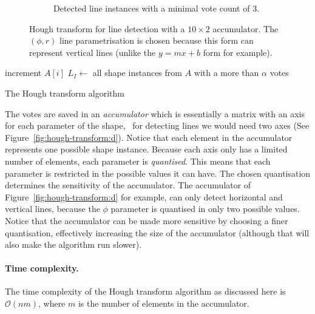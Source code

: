 \begin{figure}
\begin{subfigure}[b]{0.3\linewidth}
		\caption{Detected line instances with a minimal vote count of  3.}\label{fig:hough-transform:e}
	\end{subfigure}
	\caption{Hough transform for line detection with a $10\times2$ accumulator. The $(\phi,r)$ line parametrisation is chosen because this form can represent vertical lines (unlike the $y=mx+b$ form for example).}%
\label{fig:hough-transform}
\end{figure}
\begin{algorithm} 
	
	 {
		{
			increment $A[i]$\;
		}
	}
	$L_I \leftarrow$ all shape instances from $A$ with a more than $\alpha$ votes\;
	\caption{The Hough transform algorithm}%
\label{algo:hough-transform}
\end{algorithm}
The votes are saved in an \emph{accumulator} which is essentially a matrix with an axis for each parameter of the shape, \eg\ for detecting lines we would need two axes (See Figure~\ref{fig:hough-transform:d}).
Notice that each element in the accumulator represents one possible shape instance.
Because each axis only has a limited number of elements, each parameter is \emph{quantised}.
This means that each parameter is restricted in the possible values it can have.
The chosen quantisation determines the sensitivity of the accumulator.
The accumulator of Figure~\ref{fig:hough-transform:d} for example, can only detect horizontal and vertical lines, because the $\phi$ parameter is quantised in only two possible values.
Notice that the accumulator can be made more sensitive by choosing a finer quantisation, effectively increasing the size of the accumulator (although that will also make the algorithm run slower).

\paragraph{Time complexity.}  The time complexity of the Hough transform algorithm as discussed here is $\mathcal{O}(nm)$, where $m$ is the number of elements in the accumulator.

